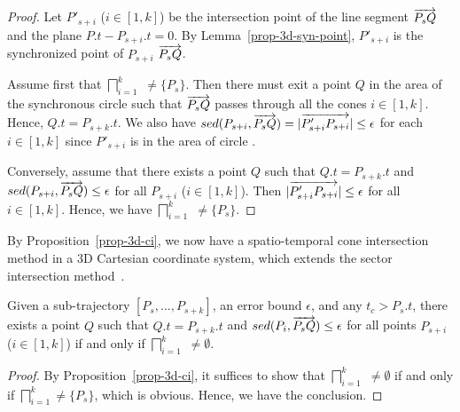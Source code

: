 \begin{proof}
Let $P'_{s+i}$ ($i\in[1, k]$) be the intersection point of the line segment $\protect\overrightarrow{P_sQ}$ and the plane $P.t - P_{s+i}.t=0$.
By Lemma~\ref{prop-3d-syn-point}, $P'_{s+i}$ is the synchronized point of $P_{s+i}$ \wrt $\protect\overrightarrow{P_sQ}$.

Assume first that $\bigsqcap_{i=1}^{k}$ $\ne \{P_s\}$. Then there must exit a point $Q $ in the area of the  synchronous circle  such that $\protect\overrightarrow{P_sQ}$ passes through all the cones  $i\in[1, k]$. Hence,  $Q.t = P_{s+k}.t$.
We also have $sed(P_{s+i}, \protect\overrightarrow{P_sQ}) = |\protect\overrightarrow{P'_{s+i}P_{s+i}}| \le \epsilon$ for each $i \in [1, k]$  since $P'_{s+i}$  is in the area of circle  .

Conversely, assume that there exists a point $Q$ such that $Q.t = P_{s+k}.t$ and $sed(P_{s+i}, \protect\overrightarrow{P_sQ})\le\epsilon$ for all $P_{s+i}$ ($i \in [1,k]$). Then $|\protect\overrightarrow{P'_{s+i}P_{s+i}}| \le \epsilon$ for all $i \in [1, k]$. Hence, we have  $\bigsqcap_{i=1}^{k}$ $\ne \{P_s\}$.
\end{proof}

By Proposition~\ref{prop-3d-ci}, we now have a spatio-temporal cone intersection method in a 3D Cartesian coordinate system, which extends the sector intersection method~\cite{Williams:Longest, Sklansky:Cone, Zhao:Sleeve}.




\begin{prop}
\label{prop-circle-intersection}
Given a sub-trajectory $[P_s,\ldots, P_{s+k}]$, an error bound $\epsilon$, and any $t_c > P_s.t$, there exists a point $Q$ such that $Q.t = P_{s+k}.t$ and $sed(P_i, \protect\overrightarrow{P_sQ})\le \epsilon$ for all points $P_{s+i}$ ($i \in [1,k]$) if and only if $\bigsqcap_{i=1}^{k}$ $\ne \emptyset$.
\end{prop}


\begin{proof}
By Proposition~\ref{prop-3d-ci}, it suffices to show that $\bigsqcap_{i=1}^{k}$  $\ne \emptyset$ if and only if $\bigsqcap_{i=1}^{k}$$\ne \{P_s\}$, which is obvious. Hence, we have the conclusion.
\end{proof}

